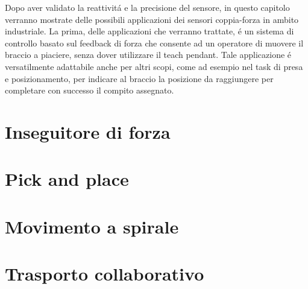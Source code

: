 Dopo aver validato la reattivit\'{a} e la precisione del sensore, in questo capitolo verranno mostrate delle possibili applicazioni 
dei sensori coppia-forza in ambito industriale. 
La prima, delle applicazioni che verranno trattate, \'{e} un sistema di controllo basato sul feedback di forza che consente ad un 
operatore di muovere il braccio a piaciere, senza dover utilizzare 
il teach pendant. Tale applicazione \'{e} versatilmente adattabile anche per altri scopi,  
come ad esempio nel task di presa e posizionamento, per indicare al braccio la posizione da raggiungere per completare 
con successo il compito assegnato.

\section{Inseguitore di forza} \label{sec:force_follower}


\section{Pick and place} \label{sec:pick_place}


\section{Movimento a spirale}


\section{Trasporto collaborativo}
